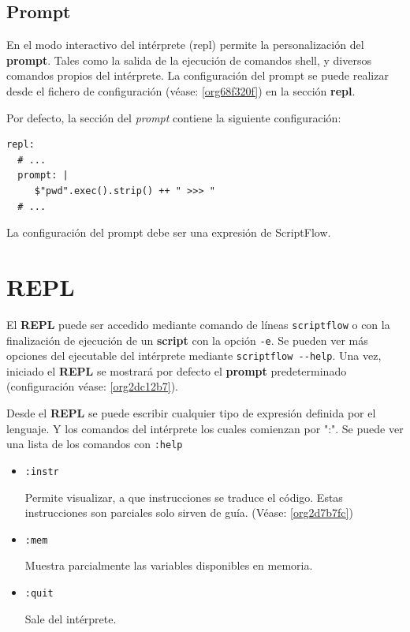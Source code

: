 \documentclass[11pt]{article}
\begin{document}
\subsection{Prompt}
\label{sec:orgf3873ed}

\label{org2dc12b7}
En el modo interactivo del intérprete (repl) permite la personalización del
\textbf{prompt}. Tales como la salida de la ejecución de comandos
shell, y diversos comandos propios del intérprete. La configuración del
prompt se puede realizar desde el fichero de configuración (véase:
\ref{org68f320f}) en la sección \textbf{repl}.

Por defecto, la sección del \emph{prompt} contiene la siguiente configuración:

\begin{verbatim}
repl:
  # ...
  prompt: |
     $"pwd".exec().strip() ++ " >>> "
  # ...
\end{verbatim}

La configuración del prompt debe ser una expresión de ScriptFlow.

\section{REPL}
\label{sec:org5413f5d}
El \textbf{REPL} puede ser accedido mediante comando de líneas \texttt{scriptflow} o con la
finalización de ejecución de un \textbf{script} con la opción \texttt{-e}. Se pueden ver más opciones del
ejecutable del intérprete mediante \texttt{scriptflow -{}-help}. Una vez,
iniciado el \textbf{REPL} se mostrará por defecto el \textbf{prompt} predeterminado
(configuración véase: \ref{org2dc12b7}).

Desde el \textbf{REPL} se puede escribir cualquier tipo de expresión definida por el
lenguaje. Y los comandos del intérprete los cuales comienzan por ":". Se
puede ver una lista de los comandos con \texttt{:help}

\begin{itemize}
\item \texttt{:instr}

Permite visualizar, a que instrucciones se traduce el código. Estas
instrucciones son parciales solo sirven de guía. (Véase: \ref{org2d7b7fc})

\item \texttt{:mem}

Muestra parcialmente las variables disponibles en memoria.

\item \texttt{:quit}

Sale del intérprete.
\end{itemize}
\end{document}
